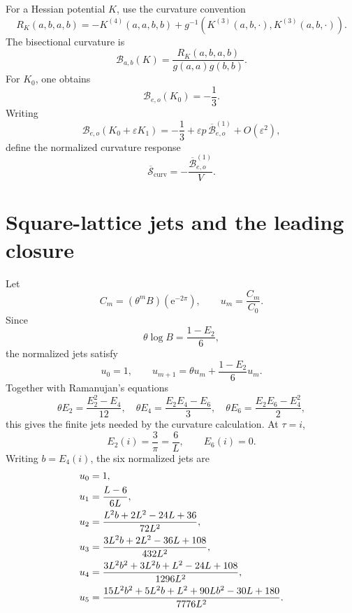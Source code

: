 \documentclass[11pt]{article}
\theoremstyle{definition}
\theoremstyle{remark}
\newcommand{\e}{\mathrm{e}}
\newcommand{\cB}{\mathcal{B}}
\newcommand{\bSc}{\overline{\mathcal{S}}_{\mathrm{curv}}}
\begin{document}
For a Hessian potential \(K\), use the curvature convention
\begin{equation}\label{eq:Rconv}
 R_K(a,b,a,b)
 =-K^{(4)}(a,a,b,b)
 +g^{-1}\!\left(K^{(3)}(a,b,\cdot),K^{(3)}(a,b,\cdot)\right).
\end{equation}
The bisectional curvature is
\begin{equation}\label{eq:Bcurv}
 \cB_{a,b}(K)=\frac{R_K(a,b,a,b)}{g(a,a)g(b,b)}.
\end{equation}
For \(K_0\), one obtains
\begin{equation}\label{eq:B0}
 \cB_{e,o}(K_0)=-\frac13.
\end{equation}
Writing
\[
 \cB_{e,o}(K_0+\varepsilon K_1)
 =-\frac13+\varepsilon p\,\overline{\cB}^{(1)}_{e,o}+O(\varepsilon^2),
\]
define the normalized curvature response
\begin{equation}\label{eq:Scurv}
 \bSc=-\frac{\overline{\cB}^{(1)}_{e,o}}{V}.
\end{equation}

\section{Square-lattice jets and the leading closure}

Let
\begin{equation}\label{eq:Cm}
 C_m=(\theta^mB)(\e^{-2\pi}),
 \qquad u_m=\frac{C_m}{C_0}.
\end{equation}
Since
\[
 \theta\log B=\frac{1-E_2}{6},
\]
the normalized jets satisfy
\begin{equation}\label{eq:urec}
 u_0=1,
 \qquad
 u_{m+1}=\theta u_m+\frac{1-E_2}{6}u_m.
\end{equation}
Together with Ramanujan's equations
\begin{equation}\label{eq:Ramanujan}
 \theta E_2=\frac{E_2^2-E_4}{12},\quad
 \theta E_4=\frac{E_2E_4-E_6}{3},\quad
 \theta E_6=\frac{E_2E_6-E_4^2}{2},
\end{equation}
this gives the finite jets needed by the curvature calculation.  At \(\tau=i\),
\begin{equation}\label{eq:fixedvalues}
 E_2(i)=\frac{3}{\pi}=\frac6L,
 \qquad E_6(i)=0.
\end{equation}
Writing \(b=E_4(i)\), the six normalized jets are
\begin{align}
 u_0&=1,\notag\\
 u_1&=\frac{L-6}{6L},\notag\\
 u_2&=\frac{L^2b+2L^2-24L+36}{72L^2},\notag\\
 u_3&=\frac{3L^2b+2L^2-36L+108}{432L^2},\label{eq:jets}\\
 u_4&=\frac{3L^2b^2+3L^2b+L^2-24L+108}{1296L^2},\notag\\
 u_5&=\frac{15L^2b^2+5L^2b+L^2+90Lb^2-30L+180}{7776L^2}.\notag
\end{align}
\end{document}
